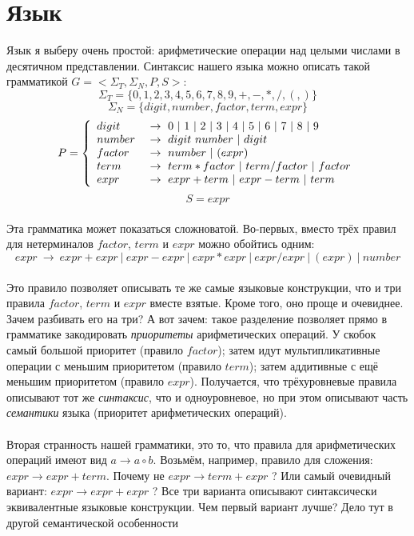 \documentclass[11pt]{book}
\begin{document}
\section{Язык}
Язык я выберу очень простой: арифметические операции над целыми числами в десятичном представлении.
Синтаксис нашего языка можно описать такой грамматикой $G=<\Sigma_T,\Sigma_N,P,S>$:
$$\Sigma_T=\{0,1,2,3,4,5,6,7,8,9,+,-,*,/,(,)\}$$
$$\Sigma_N=\{digit, number, factor, term, expr\}$$
$$P=\left\{
\begin{array}{l l}
digit \  & \rightarrow \ 0 \ | \ 1 \ | \ 2 \ | \ 3 \ | \ 4 \ | \ 5 \ | \ 6 \ | \ 7 \ | \ 8 \ | \ 9
\\
number \  & \rightarrow \ digit \ number \ | \ digit
\\
factor \  & \rightarrow \ number \ | \ ( expr )
\\
term \  & \rightarrow \ term * factor \ | \ term / factor \ | \ factor
\\
expr \  & \rightarrow \ expr + term \ | \ expr - term \ | \ term
\end{array}
\right. $$
$$S=expr$$
\\
Эта грамматика может показаться сложноватой.
Во-первых, вместо трёх правил для нетерминалов $factor$, $term$ и $expr$ можно обойтись
одним:
$$expr \  \rightarrow \ expr + expr \ | \ expr - expr \ | \ expr * expr \ | \ expr / expr \ | \ ( expr ) \ | \ number$$
\\
Это правило позволяет описывать те же самые языковые конструкции, что и три правила $factor$, $term$ и $expr$ вместе взятые.
Кроме того, оно проще и очевиднее. Зачем разбивать его на три? А вот зачем:
такое разделение позволяет прямо в грамматике закодировать \emph{приоритеты} арифметических операций.
У скобок самый большой приоритет (правило $factor$); затем идут мультипликативные операции с меньшим приоритетом (правило $term$);
затем аддитивные с ещё меньшим приоритетом (правило $expr$). Получается, что трёхуровневые правила
описывают тот же \emph{синтаксис}, что и одноуровневое, но при этом описывают часть \emph{семантики} языка
(приоритет арифметических операций).
\\ \\
Вторая странность нашей грамматики, это то, что правила для арифметических операций имеют вид
$a \rightarrow a \circ b$. Возьмём, например, правило для сложения:
$expr \rightarrow expr + term$. Почему не $expr \rightarrow term + expr$ ? Или самый очевидный
вариант: $expr \rightarrow expr + expr$ ? Все три варианта описывают синтаксически эквивалентные языковые конструкции.
Чем первый вариант лучше? Дело тут в другой семантической особенности
\end{document}
